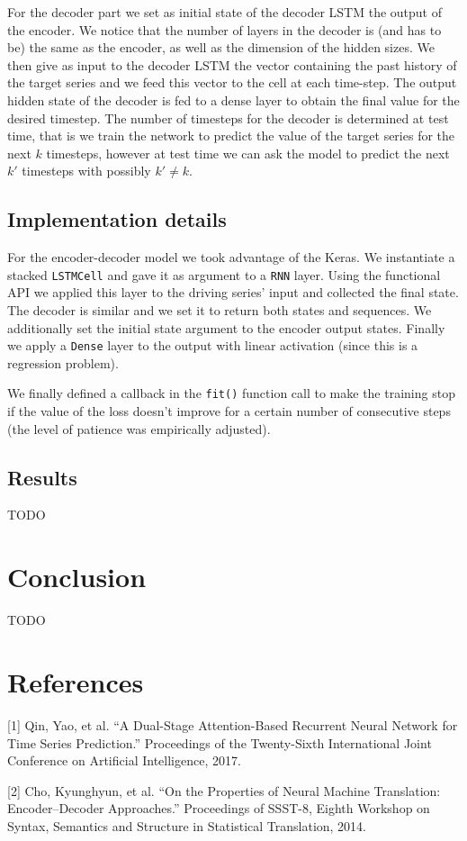 \documentclass{article}
\begin{document}
For the decoder part we set as initial state of the decoder LSTM the output of
the
encoder. We notice that the number of layers in the decoder is (and has to be)
the
same as the encoder, as well as the dimension of the hidden sizes. We then give
as
input to the decoder LSTM the vector containing the past history of the target
series and we feed this vector to the cell at each time-step. The output hidden
state of the decoder is fed to a dense layer to obtain the final value for the
desired timestep. The number of timesteps for the decoder is determined at test
time, that is we train the network to predict the value of the target series for
the next $k$ timesteps, however at test time we can ask the model to predict
the
next $k'$ timesteps with possibly $k' \ne k$.


\subsection{Implementation details}

For the encoder-decoder model we took advantage of the Keras. We instantiate a
stacked
\texttt{LSTMCell} and gave it as argument to a \texttt{RNN} layer. Using the
functional API we applied this layer to the driving series' input and collected
the final state. The decoder is similar and we set it to return both states and
sequences. We additionally set the initial state argument to the encoder output
states. Finally we apply a \texttt{Dense} layer to the output with linear
activation (since this is a regression problem).

We finally defined a callback in the \texttt{fit()} function call to make the
training stop if the value of the loss doesn't improve for a certain number of
consecutive steps (the level of patience was empirically adjusted).

\subsection{Results}
TODO

\section{Conclusion}

TODO

\newpage
\section*{References}
[1] Qin, Yao, et al. “A Dual-Stage Attention-Based Recurrent Neural Network for
Time Series Prediction.” Proceedings of the Twenty-Sixth International Joint
Conference on Artificial Intelligence, 2017.

[2] Cho, Kyunghyun, et al. “On the Properties of Neural Machine Translation:
Encoder–Decoder Approaches.” Proceedings of SSST-8, Eighth Workshop on Syntax,
Semantics and Structure in Statistical Translation, 2014.
\end{document}
